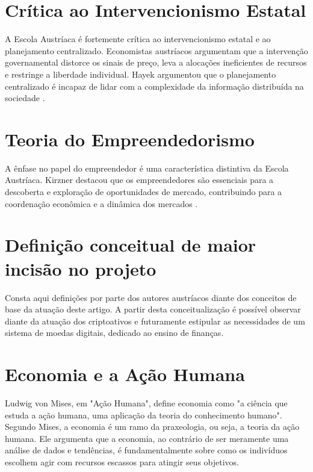 \section*{Crítica ao Intervencionismo Estatal}

A Escola Austríaca é fortemente crítica ao intervencionismo estatal e ao planejamento centralizado. Economistas austríacos argumentam que a intervenção governamental distorce os sinais de preço, leva a alocações ineficientes de recursos e restringe a liberdade individual. Hayek argumentou que o planejamento centralizado é incapaz de lidar com a complexidade da informação distribuída na sociedade \cite{hayek1944road,hayek1960constitution}.

\section*{Teoria do Empreendedorismo}

A ênfase no papel do empreendedor é uma característica distintiva da Escola Austríaca. Kirzner destacou que os empreendedores são essenciais para a descoberta e exploração de oportunidades de mercado, contribuindo para a coordenação econômica e a dinâmica dos mercados \cite{kirzner1973competition}.

\section{Definição conceitual de maior incisão no projeto}

Consta aqui definições por parte dos autores austríacos diante dos conceitos de base da atuação deste artigo. A partir desta conceitualização é possível observar diante da atuação dos criptoativos e futuramente estipular as necessidades de um sistema de moedas digitais, dedicado ao ensino de finanças.

\section*{Economia e a Ação Humana}
Ludwig von Mises, em "Ação Humana"\cite{mises1949human}, define economia como "a ciência que estuda a ação humana, uma aplicação da teoria do conhecimento humano". Segundo Mises, a economia é um ramo da praxeologia, ou seja, a teoria da ação humana. Ele argumenta que a economia, ao contrário de ser meramente uma análise de dados e tendências, é fundamentalmente sobre como os indivíduos escolhem agir com recursos escassos para atingir seus objetivos.

